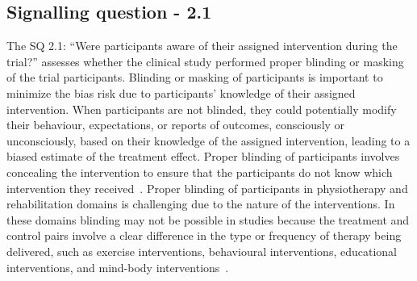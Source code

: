 \documentclass[sn-mathphys,Numbered]{sn-jnl}%
\begin{document}
\subsection*{Signalling question - 2.1}
\label{subsec:2_1}
%
The SQ 2.1: ``Were participants aware of their assigned intervention during the trial?'' assesses whether the clinical study performed proper blinding or masking of the trial participants.
Blinding or masking of participants is important to minimize the bias risk due to participants' knowledge of their assigned intervention.
When participants are not blinded, they could potentially modify their behaviour, expectations, or reports of outcomes, consciously or unconsciously, based on their knowledge of the assigned intervention, leading to a biased estimate of the treatment effect.
Proper blinding of participants involves concealing the intervention to ensure that the participants do not know which intervention they received~\cite{cedenilla2023psychosocial,swan2003bupropion,o2012rethinking}.
Proper blinding of participants in physiotherapy and rehabilitation domains is challenging due to the nature of the interventions. 
In these domains blinding may not be possible in studies because the treatment and control pairs involve a clear difference in the type or frequency of therapy being delivered, such as exercise interventions, behavioural interventions, educational interventions, and mind-body interventions~\cite{andersson2020effect,buttery2023lung}.
\end{document}
